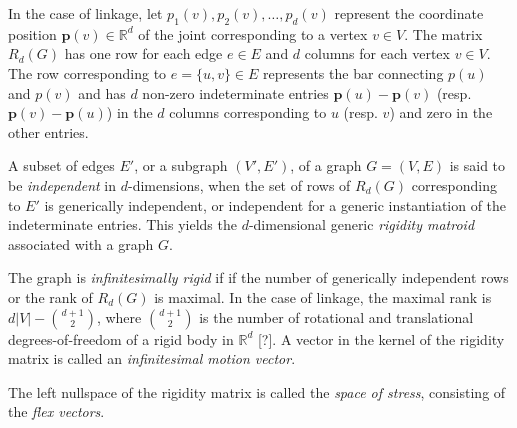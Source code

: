 
In the case of linkage, 
let $p_1(v), p_2(v), \ldots, p_d(v)$ represent the coordinate position $\mathbf{p}(v) \in \mathbb{R}^d$ of the joint corresponding to a vertex $v \in V$. 
The matrix $R_d(G)$ has one row for each edge $e \in E$ and $d$ columns for each vertex $v \in V$.  The row corresponding to $e = \{u,v\} \in E$ represents the bar connecting $p(u)$ and $p(v)$ and has $d$ non-zero indeterminate entries $\mathbf{p}(u)-\mathbf{p}(v)$ (resp.\ $\mathbf{p}(v)-\mathbf{p}(u)$) in the $d$ columns corresponding to $u$ (resp.  $v$) and zero in the other entries.  









A subset of edges $E'$, or a subgraph $(V', E')$, of a graph $G = (V, E)$ is said to be {\it independent} in $d$-dimensions, when the set of rows of $R_d(G)$ corresponding to $E'$ is generically independent, or independent for a generic instantiation of the indeterminate entries. 
This yields the $d$-dimensional generic {\it rigidity matroid} associated with a graph $G$. 

The graph is  {\it infinitesimally rigid} if %
if the number of generically independent rows or the rank of $R_d(G)$ is maximal.
In the case of linkage, the maximal rank is $d|V| - {d+1 \choose 2}$, where ${d+1 \choose 2}$ is the number of rotational and translational degrees-of-freedom of a rigid body in $\mathbb{R}^d$ [?].
A vector in the kernel of the rigidity matrix is called an {\it infinitesimal motion vector}.



The left nullspace of the rigidity matrix is called the {\it space of stress}, consisting of the {\it flex vectors}. 


